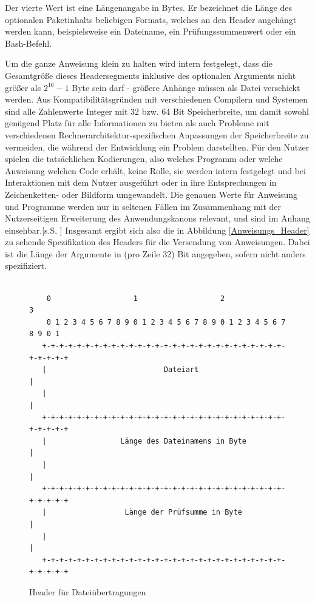 Der vierte Wert ist eine Längenangabe in Bytes.
Er bezeichnet die Länge des optionalen Paketinhalts beliebigen Formats, welches an den Header angehängt werden kann, beispielsweise ein Dateiname, ein Prüfungssummenwert oder ein Bash-Befehl.\par
Um die ganze Anweisung klein zu halten wird intern festgelegt, dass die Gesamtgröße dieses Headersegments inklusive des optionalen Arguments nicht größer als $2^{16}-1$ Byte sein darf - größere Anhänge müssen als Datei verschickt werden.
Aus Kompatibilitätsgründen mit verschiedenen Compilern und Systemen sind alle Zahlenwerte Integer mit 32 bzw. 64 Bit Speicherbreite, um damit sowohl genügend Platz für alle Informationen zu bieten als auch Probleme mit verschiedenen Rechnerarchitektur-spezifischen Anpassungen der Speicherbreite zu vermeiden, die während der Entwicklung ein Problem darstellten.
Für den Nutzer spielen die tatsächlichen Kodierungen, also welches Programm oder welche Anweisung welchen Code erhält, keine Rolle, sie werden intern festgelegt und bei  Interaktionen mit dem Nutzer ausgeführt oder in ihre Entsprechungen in Zeichenketten- oder Bildform umgewandelt.
Die genauen Werte für Anweisung und Programme werden nur in seltenen Fällen im Zusammenhang mit der Nutzerseitigen Erweiterung des Anwendungskanons relevant, und sind im Anhang einsehbar.[s.S. \pageref{enums}]
Insgesamt ergibt sich also die in Abbildung \ref{Anweisungs_Header} zu sehende Spezifikation des Headers für die Versendung von Anweisungen.
Dabei ist die Länge der Argumente in (pro Zeile 32) Bit angegeben, sofern nicht anders spezifiziert.\\\\

\begin{figure}[h]
\begin{lstlisting}
	0                   1                   2                   3
    0 1 2 3 4 5 6 7 8 9 0 1 2 3 4 5 6 7 8 9 0 1 2 3 4 5 6 7 8 9 0 1
   +-+-+-+-+-+-+-+-+-+-+-+-+-+-+-+-+-+-+-+-+-+-+-+-+-+-+-+-+-+-+-+-+
   |                           Dateiart                            |
   |                                                               |
   +-+-+-+-+-+-+-+-+-+-+-+-+-+-+-+-+-+-+-+-+-+-+-+-+-+-+-+-+-+-+-+-+
   |                 Länge des Dateinamens in Byte                 |
   |                                                               |
   +-+-+-+-+-+-+-+-+-+-+-+-+-+-+-+-+-+-+-+-+-+-+-+-+-+-+-+-+-+-+-+-+
   |                  Länge der Prüfsumme in Byte                  |
   |                                                               |
   +-+-+-+-+-+-+-+-+-+-+-+-+-+-+-+-+-+-+-+-+-+-+-+-+-+-+-+-+-+-+-+-+
\end{lstlisting}
\caption{Header für Dateiübertragungen}
\label{Datei_Header}
\end{figure}

